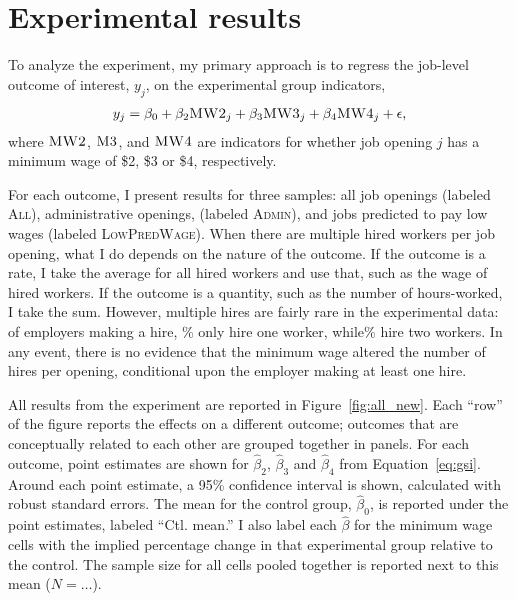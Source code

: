 \documentclass[AER]{AEA}
\newcommand{\all}{\textsc{All}}
\newcommand{\admin}{\textsc{Admin}}
\newcommand{\lpw}{\textsc{LowPredWage}}
\begin{document}
\section{Experimental results} \label{sec:er} 
To analyze the experiment, my primary approach is to regress the job-level outcome of interest, $y_j$, on the experimental group indicators, 
\begin{align} \label{eq:gsi}
  y_j = \beta_0 + \beta_{2} \textsc{MW2}_j +
  \beta_{3} \textsc{MW3}_j + \beta_{4} \textsc{MW4}_j  + \epsilon,  
\end{align}
where $\textsc{MW2}$, $\textsc{M3}$, and $\textsc{MW4}$ are indicators for whether job opening $j$ has a minimum wage of \$2, \$3 or \$4, respectively.

For each outcome, I present results for three samples: all job openings (labeled \all{}), administrative openings, (labeled \admin{}), and jobs predicted to pay low wages (labeled \lpw{}). 
When there are multiple hired workers per job opening, what I do depends on the nature of the outcome.
If the outcome is a rate, I take the average for all hired workers and use that, such as the wage of hired workers. 
If the outcome is a quantity, such as the number of hours-worked, I take the sum. 
However, multiple hires are fairly rare in the experimental data: 
of employers making a hire, \FracSingleHires{}\% only hire one worker, while\FracDoubleHires{}\% hire two workers. 
In any event, there is no evidence that the minimum wage altered the number of hires per opening, conditional upon the employer making at least one hire.  

All results from the experiment are reported in Figure~\ref{fig:all_new}.
Each ``row'' of the figure reports the effects on a different outcome; outcomes that are conceptually related to each other are grouped together in panels.
For each outcome, point estimates are shown for $\hat{\beta}_2$, $\hat{\beta}_3$ and $\hat{\beta}_4$ from Equation~\ref{eq:gsi}.
Around each point estimate, a 95\% confidence interval is shown, calculated with robust standard errors. 
The mean for the control group, $\hat{\beta}_0$, is reported under the point estimates, labeled ``Ctl. mean.''
I also label each $\hat{\beta}$ for the minimum wage cells with the implied percentage change in that experimental group relative to the control.
The sample size for all cells pooled together is reported next to this mean ($N=\ldots$).
\end{document}
